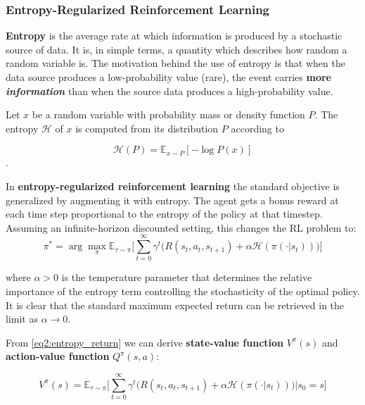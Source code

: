 \documentclass[a4paper, 11pt]{article}
\begin{document}
	\subsubsection{Entropy-Regularized Reinforcement Learning}
	
	\textbf{Entropy} is the average rate at which information is produced by a stochastic source of data. It is, in simple terms, a quantity which describes how random a random variable is. 
	The motivation behind the use of entropy is that when the data source produces a low-probability value (rare), the event carries \textbf{more \textit{information}} than when the source data produces a high-probability value.
	
	Let $x$ be a random variable with probability mass or density function $P$. The entropy $\mathcal{H}$ of $x$ is computed from its distribution $P$ according to
	
	\begin{equation} \label{eq1:entropy}
	\mathcal{H}(P) = \mathbb{E}_{x \sim P} [- \log P(x)]
	\end{equation}.
	
	In \textbf{entropy-regularized reinforcement learning} the standard objective is generalized by augmenting it with entropy. The agent gets a bonus reward at each time step proportional to the entropy of the policy at that timestep. Assuming an infinite-horizon discounted setting, this changes the RL problem to:
	\begin{equation} \label{eq2:entropy_return}
		\pi^* = \arg \max_{\pi} \mathbb{E}_{\tau \sim \pi}\Bigg[\sum_{t=0}^{\infty} \gamma^t \bigg(R(s_t, a_t, s_{t+1}) + \alpha \mathcal{H}(\pi(\cdot|s_t))\bigg)\Bigg]
	\end{equation}	
	
	where $\alpha > 0$ is the temperature parameter that determines the relative importance of the entropy term controlling the stochasticity of the optimal policy. It is clear that the standard maximum expected return can be retrieved in the limit as $\alpha \rightarrow 0$.
	
	From \vref{eq2:entropy_return} we can derive \textbf{state-value function} $V^\pi(s)$ and \textbf{action-value function} $Q^\pi(s,a)$:
	
	\begin{equation} \label{eq3:state_value}
	V^\pi(s) = \mathbb{E}_{\tau \sim \pi}\Bigg[\sum_{t=0}^{\infty} \gamma^t \bigg(R(s_t, a_t, s_{t+1}) + \alpha \mathcal{H}(\pi(\cdot|s_t))\bigg)\bigg|s_0 = s\Bigg]
	\end{equation}	
	
\end{document}
